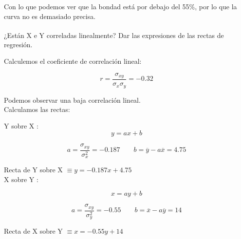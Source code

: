 Con lo que podemos ver que la bondad está por debajo del 55\%, por lo que la curva no es demasiado precisa. \\
\\

\subproblem 
¿Están X e Y correladas linealmente? Dar las expresiones de las rectas de regresión.

Calculemos el coeficiente de correlación lineal:

$$r =  \dfrac{\sigma_{xy}}{\sigma_x \sigma_y} = -0.32$$

Podemos observar una baja correlación lineal.\\

Calculamos las rectas:

Y sobre X : 
$$y = ax + b$$

$$a = \dfrac{\sigma_{xy}}{\sigma_x^2} = -0.187 \qquad b = \overline{y} - a\overline{x} = 4.75 $$

Recta de Y sobre X $\equiv y = -0.187x + 4.75$\\

X sobre Y :

$$x = ay + b$$

$$a = \dfrac{\sigma_{xy}}{\sigma_y^2} = -0.55 \qquad b = \overline{x} - a\overline{y} = 14 $$

Recta de X sobre Y $\equiv x = -0.55y + 14$ 
